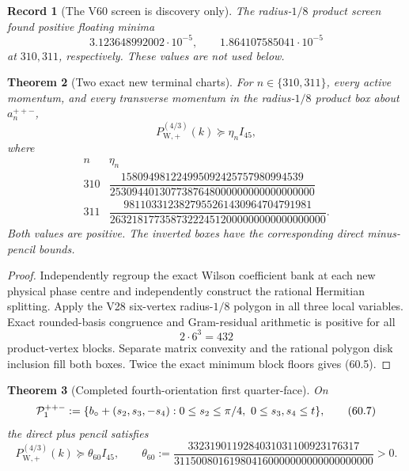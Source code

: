 \documentclass[11pt,oneside]{article}
\newtheorem{theorem}{Theorem}[section]
\newtheorem{record}[theorem]{Record}
\theoremstyle{definition}
\theoremstyle{remark}
\begin{document}
\begin{record}[The V60 screen is discovery only]
\label{rec:newv60-screen}
The radius-\(1/8\) product screen found positive floating minima
\[
 3.123648992002\cdot10^{-5},
 \qquad
 1.864107585041\cdot10^{-5}                           \tag{60.3}
\]
at \(310,311\), respectively.  These values are not used below.
\end{record}

\begin{theorem}[Two exact new terminal charts]
\label{thm:newv60-two-charts}
For \(n\in\{310,311\}\), every active momentum, and every transverse
momentum in the radius-\(1/8\) product box about
\(a_n^{++-}\),
\[
 P_{\mathrm W,+}^{(4/3)}(k)\succeq\eta_n I_{45},      \tag{60.4}
\]
where
\[
\begin{array}{c|c}
n&\eta_n\\ \hline
310&
\dfrac{158094981224995092425757980994539}
{2530944013077387648000000000000000000}\\[6pt]
311&
\dfrac{9811033123827955261430964704791981}
{263218177358732224512000000000000000000}.
\end{array}                                           \tag{60.5}
\]
Both values are positive.  The inverted boxes have the
corresponding direct minus-pencil bounds.
\end{theorem}

\begin{proof}
Independently regroup the exact Wilson coefficient bank at each
new physical phase centre and independently construct the rational
Hermitian splitting.  Apply the V28 six-vertex radius-\(1/8\)
polygon in all three local variables.  Exact rounded-basis
congruence and Gram-residual arithmetic is positive for all
\[
 2\cdot6^3=432                                        \tag{60.6}
\]
product-vertex blocks.  Separate matrix convexity and the rational
polygon disk inclusion fill both boxes.  Twice the exact minimum
block floors gives (60.5).
\end{proof}

\begin{theorem}[Completed fourth-orientation first quarter-face]
\label{thm:newv60-first-plate}
On
\[
 {\cal P}^{++-}_1:=
 \{b_\circ+(s_2,s_3,-s_4):
       0\le s_2\le\pi/4,\ 0\le s_3,s_4\le t\},        \tag{60.7}
\]
the direct plus pencil satisfies
\[
 P_{\mathrm W,+}^{(4/3)}(k)
 \succeq\theta_{60}I_{45},\qquad
 \theta_{60}:=
 \frac{3323190119284031031100923176317}
 {311500801619804160000000000000000000}>0.            \tag{60.8}
\]
\end{theorem}
\end{document}
